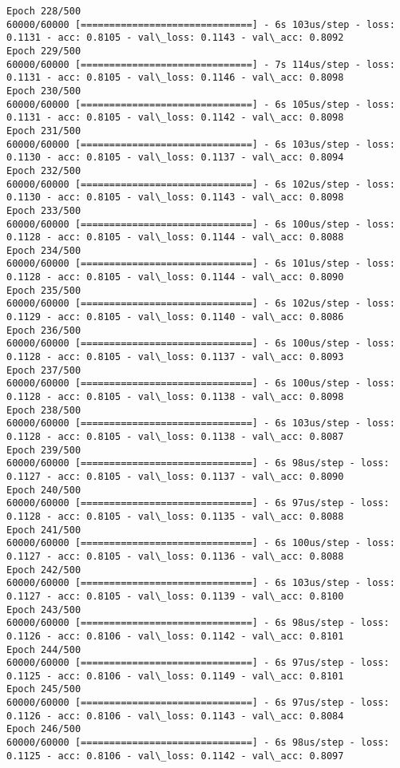 \documentclass[11pt]{article}
\begin{document}
\begin{Verbatim}[commandchars=\\\{\}]
Epoch 228/500
60000/60000 [==============================] - 6s 103us/step - loss: 0.1131 - acc: 0.8105 - val\_loss: 0.1143 - val\_acc: 0.8092
Epoch 229/500
60000/60000 [==============================] - 7s 114us/step - loss: 0.1131 - acc: 0.8105 - val\_loss: 0.1146 - val\_acc: 0.8098
Epoch 230/500
60000/60000 [==============================] - 6s 105us/step - loss: 0.1131 - acc: 0.8105 - val\_loss: 0.1142 - val\_acc: 0.8098
Epoch 231/500
60000/60000 [==============================] - 6s 103us/step - loss: 0.1130 - acc: 0.8105 - val\_loss: 0.1137 - val\_acc: 0.8094
Epoch 232/500
60000/60000 [==============================] - 6s 102us/step - loss: 0.1130 - acc: 0.8105 - val\_loss: 0.1143 - val\_acc: 0.8098
Epoch 233/500
60000/60000 [==============================] - 6s 100us/step - loss: 0.1128 - acc: 0.8105 - val\_loss: 0.1144 - val\_acc: 0.8088
Epoch 234/500
60000/60000 [==============================] - 6s 101us/step - loss: 0.1128 - acc: 0.8105 - val\_loss: 0.1144 - val\_acc: 0.8090
Epoch 235/500
60000/60000 [==============================] - 6s 102us/step - loss: 0.1129 - acc: 0.8105 - val\_loss: 0.1140 - val\_acc: 0.8086
Epoch 236/500
60000/60000 [==============================] - 6s 100us/step - loss: 0.1128 - acc: 0.8105 - val\_loss: 0.1137 - val\_acc: 0.8093
Epoch 237/500
60000/60000 [==============================] - 6s 100us/step - loss: 0.1128 - acc: 0.8105 - val\_loss: 0.1138 - val\_acc: 0.8098
Epoch 238/500
60000/60000 [==============================] - 6s 103us/step - loss: 0.1128 - acc: 0.8105 - val\_loss: 0.1138 - val\_acc: 0.8087
Epoch 239/500
60000/60000 [==============================] - 6s 98us/step - loss: 0.1127 - acc: 0.8105 - val\_loss: 0.1137 - val\_acc: 0.8090
Epoch 240/500
60000/60000 [==============================] - 6s 97us/step - loss: 0.1128 - acc: 0.8105 - val\_loss: 0.1135 - val\_acc: 0.8088
Epoch 241/500
60000/60000 [==============================] - 6s 100us/step - loss: 0.1127 - acc: 0.8105 - val\_loss: 0.1136 - val\_acc: 0.8088
Epoch 242/500
60000/60000 [==============================] - 6s 103us/step - loss: 0.1127 - acc: 0.8105 - val\_loss: 0.1139 - val\_acc: 0.8100
Epoch 243/500
60000/60000 [==============================] - 6s 98us/step - loss: 0.1126 - acc: 0.8106 - val\_loss: 0.1142 - val\_acc: 0.8101
Epoch 244/500
60000/60000 [==============================] - 6s 97us/step - loss: 0.1125 - acc: 0.8106 - val\_loss: 0.1149 - val\_acc: 0.8101
Epoch 245/500
60000/60000 [==============================] - 6s 97us/step - loss: 0.1126 - acc: 0.8106 - val\_loss: 0.1143 - val\_acc: 0.8084
Epoch 246/500
60000/60000 [==============================] - 6s 98us/step - loss: 0.1125 - acc: 0.8106 - val\_loss: 0.1142 - val\_acc: 0.8097

\end{Verbatim}
\end{document}
